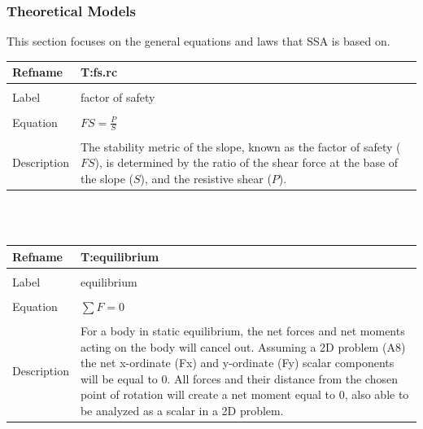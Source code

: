 \documentclass[12pt]{article}
\begin{document}
\subsubsection{Theoretical Models}
\label{Sec:TheoMode}
This section focuses on the general equations and laws that SSA is based on.
~\newline
\noindent \begin{minipage}{\textwidth}
\begin{tabular}{p{} p{}}
\toprule \textbf{Refname} & \textbf{T:fs.rc}
\label{T:fs.rc}
\\ \midrule \\
Label & factor of safety
\\ \midrule \\
Equation & $FS=\frac{P}{S}$
\\ \midrule \\
Description & The stability metric of the slope, known as the factor of safety ($FS$), is determined by the ratio of the shear force at the base of the slope ($S$), and the resistive shear ($P$).
\\ \bottomrule \end{tabular}
\end{minipage}\\
~\newline
\noindent \begin{minipage}{\textwidth}
\begin{tabular}{p{} p{}}
\toprule \textbf{Refname} & \textbf{T:equilibrium}
\label{T:equilibrium}
\\ \midrule \\
Label & equilibrium
\\ \midrule \\
Equation & $\sum{F}=0$
\\ \midrule \\
Description & For a body in static equilibrium, the net forces and net moments acting on the body will cancel out. Assuming a 2D problem (A8) the net x-ordinate (Fx) and y-ordinate (Fy) scalar components will be equal to 0. All forces and their distance from the chosen point of rotation will create a net moment equal to 0, also able to be analyzed as a scalar in a 2D problem.
\\ \bottomrule \end{tabular}
\end{minipage}\\
~\newline
\end{document}
